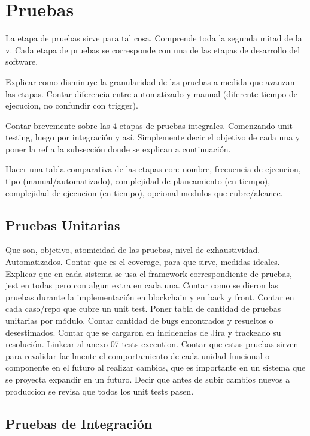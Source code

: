 \chapter[Pruebas]{Pruebas}
\label{cp:testing}

\parindent0pt

La etapa de pruebas sirve para tal cosa. Comprende toda la segunda mitad de la v. Cada etapa de pruebas se corresponde con una de las etapas de desarrollo del software.

Explicar como disminuye la granularidad de las pruebas a medida que avanzan las etapas. Contar diferencia entre automatizado y manual (diferente tiempo de ejecucion, no confundir con trigger).

Contar brevemente sobre las 4 etapas de pruebas integrales. Comenzando unit testing, luego por integración y así. Simplemente decir el objetivo de cada una y poner la ref a la subsección donde se explican a continuación.

Hacer una tabla comparativa de las etapas con: nombre, frecuencia de ejecucion, tipo (manual/automatizado), complejidad de planeamiento (en tiempo), complejidad de ejecucion (en tiempo), opcional modulos que cubre/alcance.

\section{Pruebas Unitarias}
\label{sec:unit-testing}

Que son, objetivo, atomicidad de las pruebas, nivel de exhaustividad. Automatizados.
Contar que es el coverage, para que sirve, medidas ideales.
Explicar que en cada sistema se usa el framework correspondiente de pruebas, jest en todas pero con algun extra en cada una. 
Contar como se dieron las pruebas durante la implementación en blockchain y en back y front.
Contar en cada caso/repo que cubre un unit test.
Poner tabla de cantidad de pruebas unitarias por módulo.
Contar cantidad de bugs encontrados y resueltos o desestimados. Contar que se cargaron en incidencias de Jira y trackeado su resolución.
Linkear al anexo 07 tests execution.
Contar que estas pruebas sirven para revalidar facilmente el comportamiento de cada unidad funcional o componente en el futuro al realizar cambios, que es importante en un sistema que se proyecta expandir en un futuro. 
Decir que antes de subir cambios nuevos a produccion se revisa que todos los unit tests pasen.

\section{Pruebas de Integración}
\label{sec:integration-testing}


